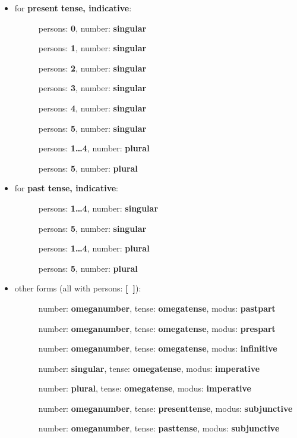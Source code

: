 \begin{itemize}
  \item for {\bf present tense, indicative}:
     \begin{description}
       \item [] persons: {\bf 0},  number:  {\bf singular}
       \item [] persons: {\bf 1},  number:  {\bf singular}
       \item [] persons: {\bf 2},  number:  {\bf singular}
       \item [] persons: {\bf 3},  number:  {\bf singular}
       \item [] persons: {\bf 4},  number:  {\bf singular} 
       \item [] persons: {\bf 5},  number:  {\bf singular}
       \item [] persons: {\bf 1\ldots 4},  number:  {\bf plural}
       \item [] persons: {\bf 5},  number:  {\bf plural}
     \end{description}  
  \item for {\bf past tense, indicative}:
     \begin{description}
       \item [] persons: {\bf 1\ldots 4}, number: {\bf singular}
       \item [] persons: {\bf 5}, number: {\bf singular}
       \item [] persons: {\bf 1\ldots 4}, number: {\bf plural}
       \item [] persons: {\bf 5}, number: {\bf plural}
     \end{description}
   \item other forms (all with persons: {\bf {[\ ]}}):
     \begin{description}
       \item [] number: {\bf omeganumber}, 
tense: {\bf omegatense}, modus: {\bf pastpart}
       \item [] number: {\bf omeganumber}, 
tense: {\bf omegatense}, modus: {\bf prespart}
       \item [] number: {\bf omeganumber}, 
tense: {\bf omegatense}, modus: {\bf infinitive}
       \item [] number: {\bf singular}, 
tense: {\bf omegatense}, modus: {\bf imperative}
       \item [] number: {\bf plural}, 
tense: {\bf omegatense}, modus: {\bf imperative}
       \item [] number: {\bf omeganumber}, 
tense: {\bf presenttense}, modus: {\bf subjunctive}
       \item [] number: {\bf omeganumber}, 
tense: {\bf pasttense}, modus: {\bf subjunctive}
     \end{description}
\end{itemize}

